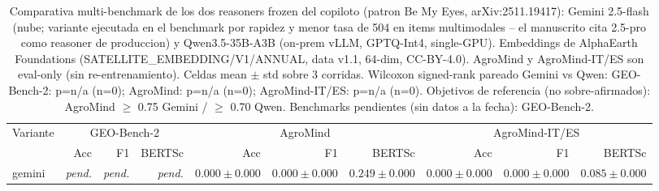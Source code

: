 \begin{table}[t]
\centering
\caption{Comparativa multi-benchmark de los dos reasoners frozen del copiloto (patron Be My Eyes, arXiv:2511.19417): Gemini 2.5-flash (nube; variante ejecutada en el benchmark por rapidez y menor tasa de 504 en items multimodales -- el manuscrito cita 2.5-pro como reasoner de produccion) y Qwen3.5-35B-A3B (on-prem vLLM, GPTQ-Int4, single-GPU). Embeddings de AlphaEarth Foundations (SATELLITE\_EMBEDDING/V1/ANNUAL, data v1.1, 64-dim, CC-BY-4.0). AgroMind y AgroMind-IT/ES son eval-only (sin re-entrenamiento). Celdas mean $\pm$ std sobre 3 corridas. Wilcoxon signed-rank pareado Gemini vs Qwen: GEO-Bench-2: p=n/a (n=0); AgroMind: p=n/a (n=0); AgroMind-IT/ES: p=n/a (n=0). Objetivos de referencia (no sobre-afirmados): AgroMind $\geq$ 0.75 Gemini / $\geq$ 0.70 Qwen. Benchmarks pendientes (sin datos a la fecha): GEO-Bench-2.}
\label{tab:paper-benchmark-comparison}
\begin{tabular}{lrrrrrrrrr}
\toprule
Variante & \multicolumn{3}{c}{GEO-Bench-2} & \multicolumn{3}{c}{AgroMind} & \multicolumn{3}{c}{AgroMind-IT/ES} \\
\cmidrule(lr){2-10}
 & Acc & F1 & BERTSc & Acc & F1 & BERTSc & Acc & F1 & BERTSc \\
\midrule
gemini & \textit{pend.} & \textit{pend.} & \textit{pend.} & $0.000 \pm 0.000$ & $0.000 \pm 0.000$ & $0.249 \pm 0.000$ & $0.000 \pm 0.000$ & $0.000 \pm 0.000$ & $0.085 \pm 0.000$ \\
\bottomrule
\end{tabular}
\end{table}
